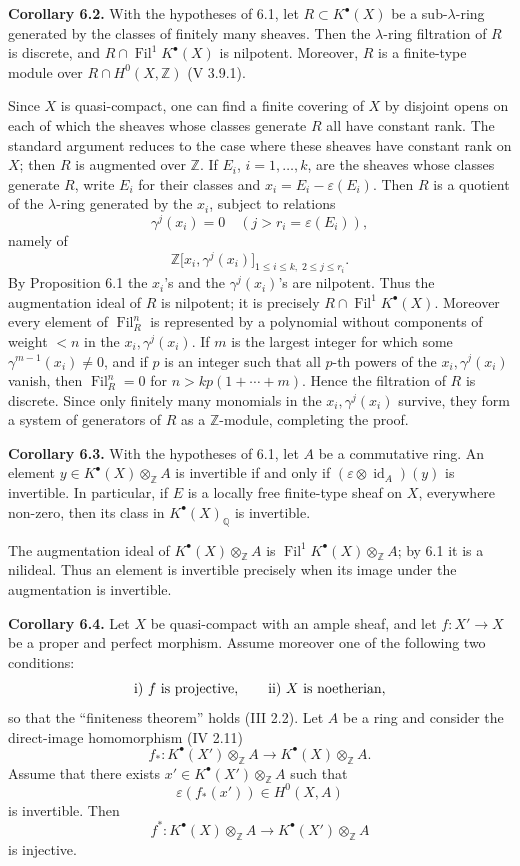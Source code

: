 \documentclass[11pt]{article}
\newcommand{\Fil}{\operatorname{Fil}}
\begin{document}
\textbf{Corollary 6.2.} With the hypotheses of 6.1, let \(R\subset K^\bullet(X)\) be a sub-\(\lambda\)-ring generated by the classes of finitely many sheaves. Then the \(\lambda\)-ring filtration of \(R\) is discrete, and \(R\cap\Fil^1K^\bullet(X)\) is nilpotent. Moreover, \(R\) is a finite-type module over \(R\cap H^0(X,\mathbb Z)\) (V 3.9.1).

Since \(X\) is quasi-compact, one can find a finite covering of \(X\) by disjoint opens on each of which the sheaves whose classes generate \(R\) all have constant rank. The standard argument reduces to the case where these sheaves have constant rank on \(X\); then \(R\) is augmented over \(\mathbb Z\). If \(E_i\), \(i=1,\ldots,k\), are the sheaves whose classes generate \(R\), write \(E_i\) for their classes and \(x_i=E_i-\varepsilon(E_i)\). Then \(R\) is a quotient of the \(\lambda\)-ring generated by the \(x_i\), subject to relations
\[
  \gamma^j(x_i)=0\quad(j>r_i=\varepsilon(E_i)),
\]
namely of
\[
  \mathbb Z\bigl[x_i,\gamma^j(x_i)\bigr]_{1\leq i\leq k,\; 2\leq j\leq r_i}.
\]
By Proposition 6.1 the \(x_i\)'s and the \(\gamma^j(x_i)\)'s are nilpotent. Thus the augmentation ideal of \(R\) is nilpotent; it is precisely \(R\cap\Fil^1K^\bullet(X)\). Moreover every element of \(\Fil_R^n\) is represented by a polynomial without components of weight \(<n\) in the \(x_i,\gamma^j(x_i)\). If \(m\) is the largest integer for which some \(\gamma^{m-1}(x_i)\neq0\), and if \(p\) is an integer such that all \(p\)-th powers of the \(x_i,\gamma^j(x_i)\) vanish, then \(\Fil_R^n=0\) for \(n>kp(1+\cdots+m)\). Hence the filtration of \(R\) is discrete. Since only finitely many monomials in the \(x_i,\gamma^j(x_i)\) survive, they form a system of generators of \(R\) as a \(\mathbb Z\)-module, completing the proof.

\textbf{Corollary 6.3.} With the hypotheses of 6.1, let \(A\) be a commutative ring. An element \(y\in K^\bullet(X)\otimes_{\mathbb Z}A\) is invertible if and only if \((\varepsilon\otimes\operatorname{id}_A)(y)\) is invertible. In particular, if \(E\) is a locally free finite-type sheaf on \(X\), everywhere non-zero, then its class in \(K^\bullet(X)_{\mathbb Q}\) is invertible.

The augmentation ideal of \(K^\bullet(X)\otimes_{\mathbb Z}A\) is \(\Fil^1K^\bullet(X)\otimes_{\mathbb Z}A\); by 6.1 it is a nilideal. Thus an element is invertible precisely when its image under the augmentation is invertible.

\textbf{Corollary 6.4.} Let \(X\) be quasi-compact with an ample sheaf, and let \(f:X'\to X\) be a proper and perfect morphism. Assume moreover one of the following two conditions:
\[
\text{\rm i) } f\text{ is projective},\qquad
\text{\rm ii) } X\text{ is noetherian},
\]
so that the ``finiteness theorem'' holds (III 2.2). Let \(A\) be a ring and consider the direct-image homomorphism (IV 2.11)
\[
  f_*:K^\bullet(X')\otimes_{\mathbb Z}A
  \longrightarrow K^\bullet(X)\otimes_{\mathbb Z}A.
\]
Assume that there exists \(x'\in K^\bullet(X')\otimes_{\mathbb Z}A\) such that
\[
  \varepsilon(f_*(x'))\in H^0(X,A)
\]
is invertible. Then
\[
  f^*:K^\bullet(X)\otimes_{\mathbb Z}A
       \longrightarrow K^\bullet(X')\otimes_{\mathbb Z}A
\]
is injective.
\end{document}
